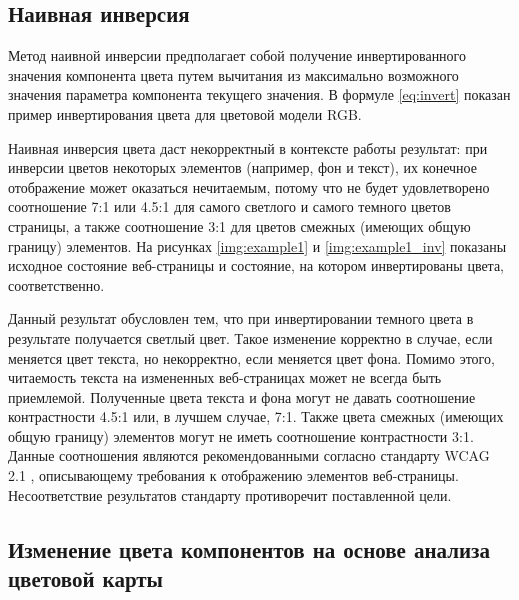\subsection{Наивная инверсия}

Метод наивной инверсии предполагает собой получение инвертированного значения компонента цвета путем вычитания из максимально возможного значения параметра компонента текущего значения. В формуле \ref{eq:invert} показан пример инвертирования цвета для цветовой модели RGB.

Наивная инверсия цвета даст некорректный в контексте работы результат: при инверсии цветов некоторых элементов (например, фон и текст), их конечное отображение может оказаться нечитаемым, потому что не будет удовлетворено соотношение 7:1 или 4.5:1 \cite{wcag1} для самого светлого и самого темного цветов страницы, а также соотношение 3:1 \cite{wcag2} для цветов смежных (имеющих общую границу) элементов. На рисунках \ref{img:example1} и \ref{img:example1_inv} показаны исходное состояние веб-страницы и состояние, на котором инвертированы цвета, соответственно.

Данный результат обусловлен тем, что при инвертировании темного цвета в результате получается светлый цвет. Такое изменение корректно в случае, если меняется цвет текста, но некорректно, если меняется цвет фона. Помимо этого, читаемость текста на измененных веб-страницах может не всегда быть приемлемой. Полученные цвета текста и фона могут не давать соотношение контрастности 4.5:1 или, в лучшем случае, 7:1. Также цвета смежных (имеющих общую границу) элементов могут не иметь соотношение контрастности 3:1. Данные соотношения являются рекомендованными согласно стандарту WCAG 2.1 \cite{wcag}, описывающему требования к отображению элементов веб-страницы. Несоответствие результатов стандарту противоречит поставленной цели.




\subsection{Изменение цвета компонентов на основе анализа цветовой карты}

